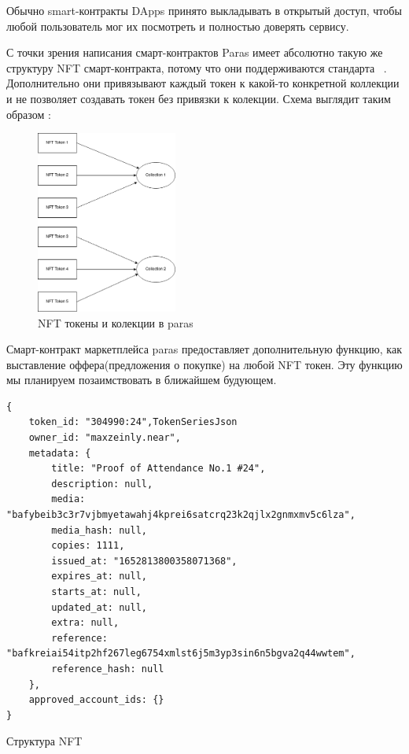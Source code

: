 \begin{remark}
    Обычно smart-контракты DApps принято выкладывать в открытый доступ, чтобы любой пользователь мог их посмотреть и полностью доверять сервису.
\end{remark}

С точки зрения написания смарт-контрактов Paras имеет абсолютно такую же структуру NFT смарт-контракта, потому что они поддерживаются стандарта ~\cite{nftstandart}.
Дополнительно они привязывают каждый токен к какой-то конкретной коллекции и не позволяет создавать токен без привязки к колекции.
Схема выглядит таким образом \hyperref[img.parascollections]{\color{blue}}:

\begin{figure}[H]
	\centering
	\includegraphics[height=60mm]{fig/parascollections.png}
	\caption{NFT токены и колекции в paras}
    \label{img.parascollections}
\end{figure}

Смарт-контракт маркетплейса paras предоставляет дополнительную функцию, как выставление оффера(предложения о покупке) на любой NFT токен. Эту функцию мы планируем позаимствовать в ближайшем будующем.

\begin{listing}
\begin{verbatim}
{
    token_id: "304990:24",TokenSeriesJson
    owner_id: "maxzeinly.near",
    metadata: {
        title: "Proof of Attendance No.1 #24",
        description: null,
        media: "bafybeib3c3r7vjbmyetawahj4kprei6satcrq23k2qjlx2gnmxmv5c6lza",
        media_hash: null,
        copies: 1111,
        issued_at: "1652813800358071368",
        expires_at: null,
        starts_at: null,
        updated_at: null,
        extra: null,
        reference: "bafkreiai54itp2hf267leg6754xmlst6j5m3yp3sin6n5bgva2q44wwtem",
        reference_hash: null
    },
    approved_account_ids: {}
}
\end{verbatim}
\caption{Структура NFT}
\end{listing}

